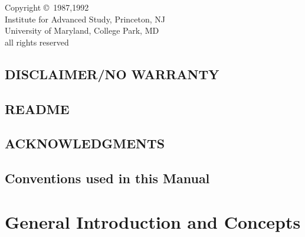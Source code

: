 \begin{center}
\vspace{2 in}
Copyright \copyright\ 1987,1992\\
Institute for Advanced Study, Princeton, NJ\\
University of Maryland, College Park, MD\\
all rights reserved
\end{center}
\normalsize
\vspace*{\fill}
\cleardoublepage
\pagestyle{headings}
\tableofcontents
\newpage
{}
\listoftables
\newpage
{}
\listoffigures
\newpage

\chapter*{DISCLAIMER/NO WARRANTY}


\chapter*{README}


\chapter*{ACKNOWLEDGMENTS}


\chapter*{Conventions used in this Manual}
 
\cleardoublepage
{}
\part{General Introduction and Concepts}
